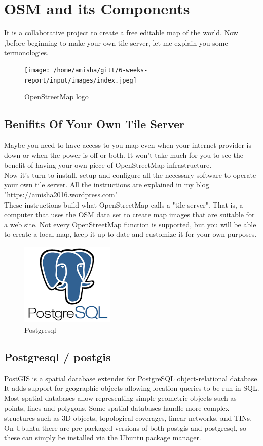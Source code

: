 \section{OSM and its Components }
It is a collaborative project to create a free editable map of the world.
Now ,before beginning to make your own tile server, let me explain you some termonologies.
\begin{figure}[ht]
\centering \texttt{[image: /home/amisha/gitt/6-weeks-report/input/images/index.jpeg]}
\caption{OpenStreetMap logo}
\end{figure}

\subsection{Benifits Of Your Own Tile Server}
Maybe you need to have access to you map even when your internet provider is down or when the power is off or both. It won't take much for you to see the benefit of having your own piece of OpenStreetMap infrastructure.\\
Now it's turn to install, setup and configure all the necessary software to operate your own tile server. All the instructions are explained in my blog "https://amisha2016.wordpress.com"\\
These instructions build what OpenStreetMap calls a "tile server". That is, a computer that uses the OSM data set to create map images that are suitable for a web site. Not every OpenStreetMap function is supported, but you will be able to create a local map, keep it up to date and customize it for your own purposes.
\begin{figure}[!ht]
\centering
\includegraphics[width=0.4\textwidth]{input/images/index.png}                   
\caption{Postgresql}
\hspace{-1.5em}
\end{figure}


\subsection{Postgresql / postgis}
PostGIS is a spatial database extender for PostgreSQL object-relational database. It adds support for geographic objects allowing location queries to be run in SQL.\\
Most spatial databases allow representing simple geometric objects such as points, lines and polygons. Some spatial databases handle more complex structures such as 3D objects, topological coverages, linear networks, and TINs.\\
On Ubuntu there are pre-packaged versions of both postgis and postgresql, so these can simply be installed via the Ubuntu package manager.\\
